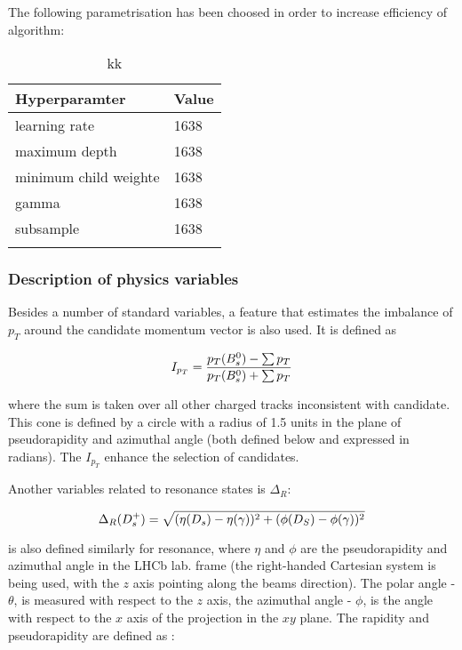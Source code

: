 The following parametrisation has been choosed in order to increase efficiency of algorithm:

\begin{table}[h!]
\begin{center}
\begin{tabular}{ p{3.6cm}p{3.1cm}}
\hline
\hline
Hyperparamter  &   Value \\
\hline
    learning rate    & 1638	\\
    maximum depth    & 1638	\\
    minimum child weighte    & 1638	\\
    gamma    & 1638	\\
    subsample    & 1638	\\
    
\hline
\caption{kk}
\end{tabular}
\end{center}
\end{table}

\subsubsection{Description of physics variables }

Besides a number of standard variables, a feature that estimates the imbalance of $p_T$ around the \Bs candidate momentum vector is also used. It is defined as

\begin{equation}
I_{p_T} = \frac{p_T({{B}^0_{s}}) - \sum p_T}{p_T({{B}^0_{s}}) + \sum p_T}
\label{eq::bdt_1}
\end{equation}

 where the sum is taken over all other charged tracks inconsistent with \Bs candidate. This cone is defined by a circle with a radius of 1.5 units in the plane of pseudorapidity and azimuthal angle (both defined below and expressed in radians). The $I_{p_T}$  enhance the selection of \Bs candidates.
 
 Another variables related to resonance states is $\Delta_R$:

\begin{equation}
\Delta_R({{D}^+_{s}}) = \sqrt{(\eta(D_s)-\eta(\gamma))^2+(\phi(D_S)-\phi(\gamma))^2}
\label{eq::bdt_2}
\end{equation}
 
is also defined similarly for \Kstarm resonance, where $\eta$ and $\phi$ are the pseudorapidity and azimuthal angle in the LHCb lab. frame (the right-handed Cartesian system is being used, with the $z$ axis pointing along the beams direction). The polar angle - $\theta$, is measured with respect to the $z$ axis, the azimuthal angle - $\phi$, is the angle with respect to the $x$ axis of the projection in the $xy$ plane. The rapidity and pseudorapidity are defined as :


